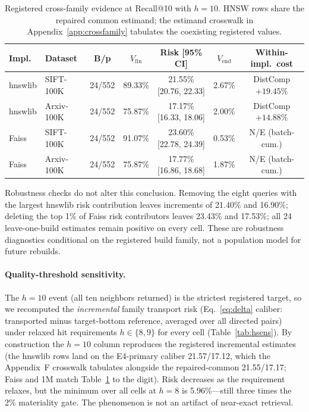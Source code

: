 \documentclass{article}
\begin{document}
\begin{table}[t]
\centering
\caption{Registered cross-family evidence at Recall@10 with $h{=}10$. HNSW rows share the repaired common
estimand; the estimand crosswalk in Appendix~\ref{app:crossfamily} tabulates the coexisting registered
values.}
\label{tab:crossfamily}
\footnotesize
\setlength{\tabcolsep}{2.6pt}
\begin{tabular}{llccccc}
\toprule
Impl. & Dataset & B/p & $V_{\mathrm{fin}}$ & Risk [95\% CI] & $V_{\mathrm{end}}$ & Within-impl.\ cost \\
\midrule
hnswlib & SIFT-100K & 24/552 & 89.33\% & 21.55\% {\tiny[20.76, 22.33]} & 2.67\% & DistComp $+19.45\%$ \\
hnswlib & Arxiv-100K & 24/552 & 75.87\% & 17.17\% {\tiny[16.33, 18.06]} & 2.00\% & DistComp $+14.88\%$ \\
Faiss & SIFT-100K & 24/552 & 91.07\% & 23.60\% {\tiny[22.78, 24.39]} & 0.53\% & N/E (batch-cum.) \\
Faiss & Arxiv-100K & 24/552 & 75.87\% & 17.77\% {\tiny[16.86, 18.68]} & 1.87\% & N/E (batch-cum.) \\
\bottomrule
\end{tabular}
\end{table}

Robustness checks do not alter this conclusion. Removing the eight queries with the largest hnswlib risk
contribution leaves increments of 21.40\% and 16.90\%; deleting the top 1\% of Faiss risk contributors
leaves 23.43\% and 17.53\%; all 24 leave-one-build estimates remain positive on every cell. These are
robustness diagnostics conditional on the registered build family, not a population model for future
rebuilds.

\paragraph{Quality-threshold sensitivity.}
The $h{=}10$ event (all ten neighbors returned) is the strictest registered target, so we recomputed the
\emph{incremental} family transport risk (Eq.~\ref{eq:delta} caliber: transported minus target-bottom
reference, averaged over all directed pairs) under relaxed hit requirements $h\in\{8,9\}$ for every cell
(Table~\ref{tab:hsens}). By construction the $h{=}10$ column reproduces the registered incremental
estimates (the hnswlib rows land on the E4-primary caliber 21.57/17.12, which the Appendix~F crosswalk
tabulates alongside the repaired-common 21.55/17.17; Faiss and 1M match Table~\ref{tab:crossfamily} to
the digit). Risk decreases as the requirement relaxes, but the minimum over all cells at $h{=}8$ is
5.96\%---still three times the 2\% materiality gate. The phenomenon is not an artifact of near-exact
retrieval.
\end{document}

